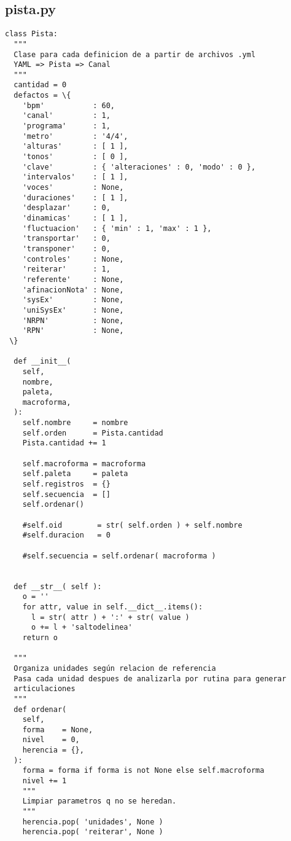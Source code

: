 \documentclass[]{article}
\begin{document}
\hypertarget{pista.py}{%
\subsection{pista.py}\label{pista.py}}

\begin{verbatim}
class Pista:
  """
  Clase para cada definicion de a partir de archivos .yml
  YAML => Pista => Canal 
  """
  cantidad = 0 
  defactos = \{
    'bpm'           : 60,
    'canal'         : 1,
    'programa'      : 1,
    'metro'         : '4/4',
    'alturas'       : [ 1 ],
    'tonos'         : [ 0 ],
    'clave'         : { 'alteraciones' : 0, 'modo' : 0 },
    'intervalos'    : [ 1 ],
    'voces'         : None,
    'duraciones'    : [ 1 ],
    'desplazar'     : 0,
    'dinamicas'     : [ 1 ],
    'fluctuacion'   : { 'min' : 1, 'max' : 1 },
    'transportar'   : 0,
    'transponer'    : 0,
    'controles'     : None,
    'reiterar'      : 1,
    'referente'     : None,
    'afinacionNota' : None,
    'sysEx'         : None,
    'uniSysEx'      : None,
    'NRPN'          : None,
    'RPN'           : None,
 \} 
 
  def __init__( 
    self,
    nombre,
    paleta,
    macroforma,
  ):
    self.nombre     = nombre
    self.orden      = Pista.cantidad 
    Pista.cantidad += 1

    self.macroforma = macroforma
    self.paleta     = paleta
    self.registros  = {}
    self.secuencia  = [] 
    self.ordenar()

    #self.oid        = str( self.orden ) + self.nombre 
    #self.duracion   = 0

    #self.secuencia = self.ordenar( macroforma )


  def __str__( self ):
    o = '' 
    for attr, value in self.__dict__.items():
      l = str( attr ) + ':' + str( value )
      o += l + 'saltodelinea'
    return o

  """
  Organiza unidades según relacion de referencia
  Pasa cada unidad despues de analizarla por rutina para generar
  articulaciones 
  """
  def ordenar( 
    self,
    forma    = None,
    nivel    = 0,
    herencia = {},
  ):
    forma = forma if forma is not None else self.macroforma
    nivel += 1
    """
    Limpiar parametros q no se heredan.
    """
    herencia.pop( 'unidades', None )
    herencia.pop( 'reiterar', None )


\end{verbatim}
\end{document}
